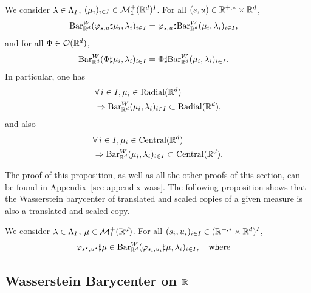 \begin{prop}\label{prop-invariance-W}
	We consider $\lambda \in \Lambda_I$, $(\mu_i)_{i \in I} \in \mathcal{M}_1^+(\mathbb{R}^d)^I$. 
	For all $(s,u) \in \mathbb{R}^{+,*} \times \mathbb{R}^d$, 
	\begin{align} \label{eq-prop-inv-1}
		\text{\upshape Bar}_{\mathbb{R}^d}^W(\varphi_{s,u} \sharp \mu_i,\lambda_i)_{i \in I} & = 
				\varphi_{s,u} \sharp \text{\upshape Bar}_{\mathbb{R}^d}^W(\mu_i,\lambda_i)_{i \in I},
	\end{align}
	and for all $\Phi \in \mathcal{O}(\mathbb{R}^d)$, 
	\begin{align} \label{eq-prop-inv-rot}
		\text{\upshape Bar}_{\mathbb{R}^d}^W( \Phi \sharp \mu_i,\lambda_i)_{i \in I} & = 
				\Phi \sharp \text{\upshape Bar}_{\mathbb{R}^d}^W(\mu_i,\lambda_i)_{i \in I}.
	\end{align}	
	In particular, one has
	\begin{align} \label{eq-prop-inv-rad}
		&\forall \, i \in I, \mu_i \in \text{\upshape Radial}(\mathbb{R}^d) \\
			& \Rightarrow \text{\upshape Bar}_{\mathbb{R}^d}^W(\mu_i,\lambda_i)_{i \in I} \subset \text{\upshape Radial}(\mathbb{R}^d),
	\end{align}
	and also
	\begin{align} \label{eq-prop-inv-cent}
		&\forall \, i \in I, \mu_i \in \text{\upshape Central}(\mathbb{R}^d) \\
			& \Rightarrow \text{\upshape Bar}_{\mathbb{R}^d}^W(\mu_i,\lambda_i)_{i \in I} \subset \text{\upshape Central}(\mathbb{R}^d).
	\end{align}	
\end{prop}

The proof of this proposition, as well as all the other proofs of this section, can be found in Appendix~\ref{sec-appendix-wass}.
The following proposition shows that the Wasserstein barycenter of translated and scaled copies of a given measure is also a translated and scaled copy.

\begin{prop}\label{prop-invariance-W-bis}
	We consider $\lambda \in \Lambda_I$, $\mu  \in \mathcal{M}_1^+(\mathbb{R}^d)$. 	
	For all $(s_i,u_i)_{i \in I} \in (\mathbb{R}^{+,*} \times \mathbb{R}^d)^I$, 
	\begin{align} \label{eq-prop-inv-2}			
		\varphi_{s^\star,u^\star} \sharp \mu \in \text{\upshape Bar}_{\mathbb{R}^d}^W(\varphi_{s_i,u_i} \sharp \mu,\lambda_i)_{i \in I}, 
		 \quad \text{where} \quad
	\end{align}
\end{prop}


\subsection{Wasserstein Barycenter on $\mathbb{R}$}

